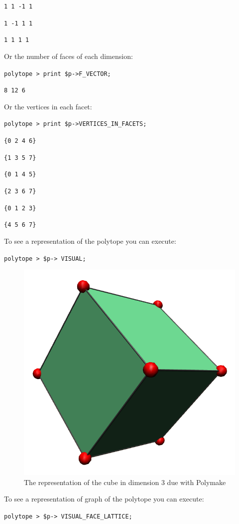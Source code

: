 \texttt{1 1 -1 1}

\texttt{1 -1 1 1}

\texttt{1 1 1 1}

Or the number of faces of each dimension:

\texttt{polytope > print \$p->F\_VECTOR;}

\texttt{8 12 6}

Or the vertices in each facet:

\texttt{polytope > print \$p->VERTICES\_IN\_FACETS;}

\texttt{\{0 2 4 6\}}

\texttt{\{1 3 5 7\}}

\texttt{\{0 1 4 5\}}

\texttt{\{2 3 6 7\}}

\texttt{\{0 1 2 3\}}

\texttt{\{4 5 6 7\}}

To see a representation of the polytope you can execute:

\texttt{polytope > \$p-> VISUAL;}

\begin{figure}[htbp]
  \centering
  \includegraphics[width=.5\linewidth]{l6_cube.png}
  
  \caption{The representation of the cube in dimension 3 due with Polymake}
\label{fig:l6:1}
\end{figure}

To see a representation of graph of the polytope you can execute:

\texttt{polytope > \$p-> VISUAL\_FACE\_LATTICE;}

